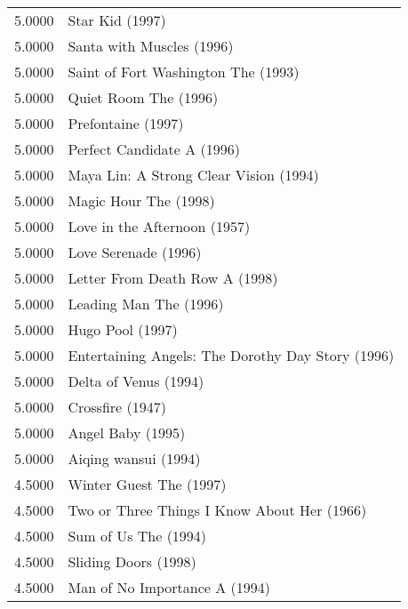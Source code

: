 \begin{flushleft}
\begin{table}[h]
\centering
\setlength{\tabcolsep}{12pt}
\begin{tabular}{|ll|} \hline
5.0000 & Star Kid (1997)                                         \\ 
5.0000 & Santa with Muscles (1996)                               \\
5.0000 & Saint of Fort Washington The (1993)                     \\
5.0000 & Quiet Room The (1996)                                   \\
5.0000 & Prefontaine (1997)                                      \\
5.0000 & Perfect Candidate A (1996)                              \\
5.0000 & Maya Lin: A Strong Clear Vision (1994)                  \\
5.0000 & Magic Hour The (1998)                                   \\
5.0000 & Love in the Afternoon (1957)                            \\
5.0000 & Love Serenade (1996)                                    \\
5.0000 & Letter From Death Row A (1998)                          \\
5.0000 & Leading Man The (1996)                                  \\
5.0000 & Hugo Pool (1997)                                        \\
5.0000 & Entertaining Angels: The Dorothy Day Story (1996)       \\
5.0000 & Delta of Venus (1994)                                   \\
5.0000 & Crossfire (1947)                                        \\
5.0000 & Angel Baby (1995)                                       \\
5.0000 & Aiqing wansui (1994)                                    \\ \hline
4.5000 & Winter Guest The (1997)                                 \\
4.5000 & Two or Three Things I Know About Her (1966)             \\
4.5000 & Sum of Us The (1994)                                    \\
4.5000 & Sliding Doors (1998)                                    \\
4.5000 & Man of No Importance A (1994)                           \\

\end{tabular}
\end{table}
\end{flushleft}
